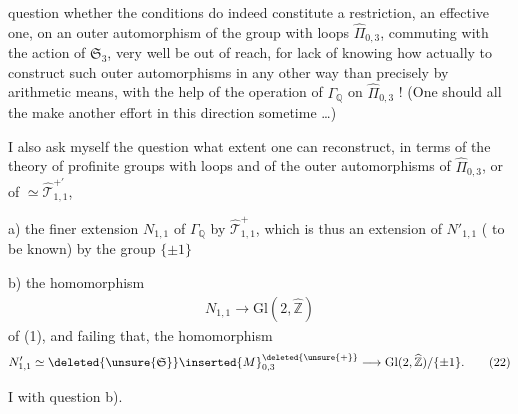 
question whether the conditions do indeed constitute a restriction, an effective one, on an outer automorphism of the group with loops $\widehat{\Pi}_{0,3}$, commuting with the action of $\mathfrak{S}_3$,  very well be out of reach, for lack of knowing how actually to construct such outer automorphisms  in any other way than precisely by arithmetic means, with the help of the operation of $\Gamma_{\mathbb{Q}}$ on $\widehat{\Pi}_{0,3}$ ! (One should all the  make another effort in this direction sometime \ldots)

I also ask myself the question  what extent one can reconstruct, in terms of the theory of profinite groups with loops and of the  outer automorphisms of $\widehat{\Pi}_{0,3}$, or of  $\simeq \widehat{\mathcal{T}}_{1,1}^{+\prime}$, 



a) the finer extension $N_{1,1}$ of $\Gamma_{\mathbb{Q}}$ by $\widehat{\mathcal{T}}_{1,1}^{+}$, which is thus an extension of $N'_{1,1}$ ( to be known) by the group $\{\pm1\}$

b) the homomorphism
\[
\begin{array}{|c|}
\hline
N_{1,1}\longrightarrow \mathrm{Gl}(2,\widehat{\mathbb{Z}})
\end{array}
\tag{21}
\]
of (1), and failing that, the homomorphism
\[
N'_{1,1}\simeq
\deleted{\unsure{\mathfrak{S}}}\inserted{M}_{0,3}^{\deleted{\unsure{+}}}
\longrightarrow
\mathrm{Gl}(2,\widehat{\mathbb{Z}})/\{\pm1\}.
\tag{22}
\]

I  with question b).

